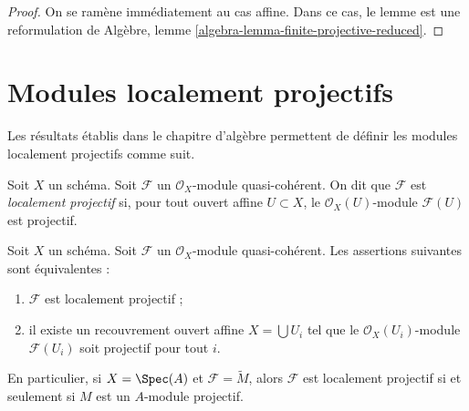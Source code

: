\begin{proof}
On se ramène immédiatement au cas affine.
Dans ce cas, le lemme est une reformulation de
Algèbre, lemme \ref{algebra-lemma-finite-projective-reduced}.
\end{proof}

\section{Modules localement projectifs}
\label{section-locally-projective}

\noindent
Les résultats établis dans le chapitre d'algèbre permettent
de définir les modules localement projectifs comme suit.

\begin{definition}
\label{definition-locally-projective}
Soit $X$ un schéma. Soit $\mathcal{F}$ un
$\mathcal{O}_X$-module quasi-cohérent. On dit que $\mathcal{F}$ est {\it localement projectif}
si, pour tout ouvert affine $U \subset X$, le $\mathcal{O}_X(U)$-module
$\mathcal{F}(U)$ est projectif.
\end{definition}

\begin{lemma}
\label{lemma-locally-projective}
Soit $X$ un schéma.
Soit $\mathcal{F}$ un $\mathcal{O}_X$-module quasi-cohérent.
Les assertions suivantes sont équivalentes :
\begin{enumerate}
\item $\mathcal{F}$ est localement projectif ;
\item il existe un recouvrement ouvert affine $X = \bigcup U_i$
tel que le $\mathcal{O}_X(U_i)$-module
$\mathcal{F}(U_i)$ soit projectif pour tout $i$.
\end{enumerate}
En particulier, si $X = \Spec(A)$ et $\mathcal{F} = \widetilde{M}$,
alors $\mathcal{F}$ est localement projectif si et seulement si $M$ est un
$A$-module projectif.
\end{lemma}

